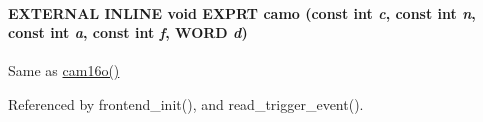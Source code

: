 \paragraph[{camo}]{\setlength{\rightskip}{0pt plus 5cm}EXTERNAL INLINE void EXPRT camo (const int {\em c}, \/  const int {\em n}, \/  const int {\em a}, \/  const int {\em f}, \/  {\bf WORD} {\em d})}\hfill\label{group__mcstdfunctionh_ga0c0e5e0a19205781825e673e694db77f}
Same as \hyperlink{group__mcstdfunctionh_gadee944c3c864999f507a2df2a50f1f1f}{cam16o()} 

Referenced by frontend\_\-init(), and read\_\-trigger\_\-event().